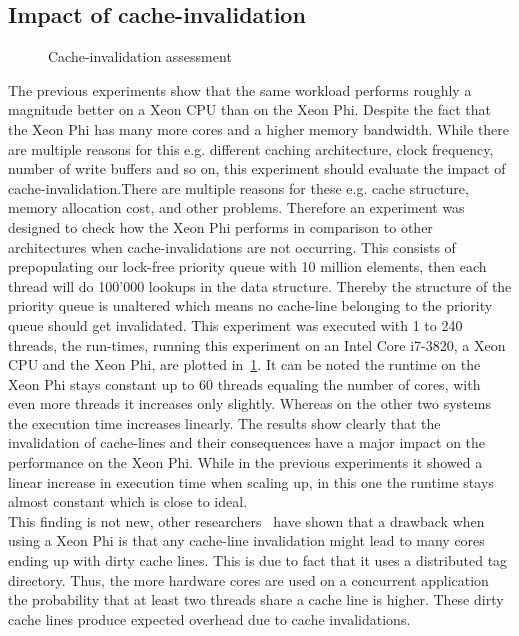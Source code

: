 \subsection{Impact of cache-invalidation}
\begin{figure}[t]
	\centering
	
	\caption{Cache-invalidation assessment}
	\label{fig:comp_contains}
\end{figure}
The previous experiments show that the same workload performs roughly a magnitude better on a Xeon CPU than on the Xeon Phi. Despite the fact that the Xeon Phi has many more cores and a higher memory bandwidth. While there are multiple reasons for this e.g. different caching architecture, clock frequency, number of write buffers and so on, this experiment should evaluate the impact of cache-invalidation.There are multiple reasons for these e.g. cache structure, memory allocation cost, and other problems. Therefore an experiment was designed to check how the Xeon Phi performs in comparison to other architectures when cache-invalidations are not occurring. This consists of prepopulating our lock-free priority queue with 10 million elements, then each thread will do 100'000 lookups in the data structure. Thereby the structure of the priority queue is unaltered which means no cache-line belonging to the priority queue should get invalidated. This experiment was executed with 1 to 240 threads, the run-times, running this experiment on an Intel Core i7-3820, a Xeon CPU and the Xeon Phi, are plotted in\figurename~\ref{fig:comp_contains}. It can be noted the runtime on the Xeon Phi stays constant up to 60 threads equaling the number of cores, with even more threads it increases only slightly. Whereas on the other two systems the execution time increases linearly. The results show clearly that the invalidation of cache-lines and their consequences have a major impact on the performance on the Xeon Phi. While in the previous experiments it showed a linear increase in execution time when scaling up, in this one the runtime stays almost constant which is close to ideal.\\
This finding is not new, other researchers~\cite{ramos-hoefler-cc-modeling} have shown that a drawback when using a Xeon Phi is that any cache-line invalidation might lead to many cores ending up with dirty cache lines. This is due to fact that it uses a distributed tag directory. Thus, the more hardware cores are used on a concurrent application the probability that at least two threads share a cache line is higher. These dirty cache lines produce expected overhead due to cache invalidations.\\

